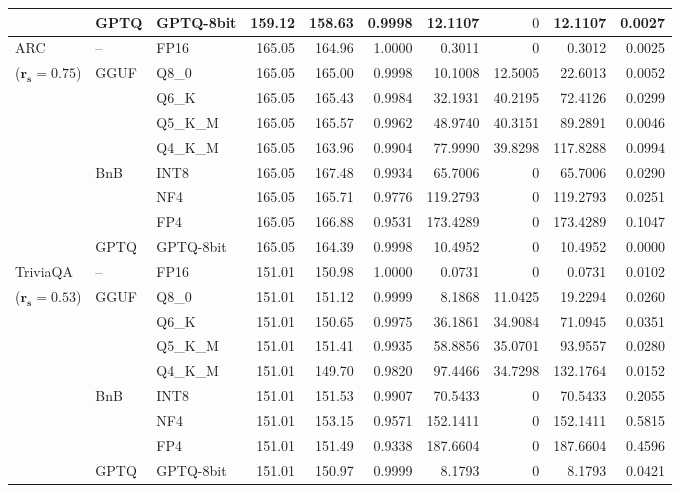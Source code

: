 \begin{longtable}{ll l rrrrrrr}
 & GPTQ & GPTQ-8bit & 159.12 & 158.63 & 0.9998 & 12.1107 & \cellcolor{cyan!12} $0$ & 12.1107 & 0.0027 \\
\midrule
ARC & -- & FP16 & 165.05 & 164.96 & 1.0000 & 0.3011 & \cellcolor{cyan!12} $0$ & 0.3012 & 0.0025 \\
{\small ($\mathbf{r_s{=}0.75}$)} & GGUF & Q8\_0 & 165.05 & 165.00 & 0.9998 & 10.1008 & 12.5005 & 22.6013 & 0.0052 \\
 &  & Q6\_K & 165.05 & 165.43 & 0.9984 & 32.1931 & 40.2195 & 72.4126 & 0.0299 \\
 &  & Q5\_K\_M & 165.05 & 165.57 & 0.9962 & 48.9740 & 40.3151 & 89.2891 & 0.0046 \\
 &  & Q4\_K\_M & 165.05 & 163.96 & 0.9904 & 77.9990 & 39.8298 & 117.8288 & 0.0994 \\
 & BnB & INT8 & 165.05 & 167.48 & 0.9934 & 65.7006 & \cellcolor{cyan!12} $0$ & 65.7006 & 0.0290 \\
 &  & NF4 & 165.05 & 165.71 & 0.9776 & 119.2793 & \cellcolor{cyan!12} $0$ & 119.2793 & 0.0251 \\
 &  & FP4 & 165.05 & 166.88 & 0.9531 & 173.4289 & \cellcolor{cyan!12} $0$ & 173.4289 & 0.1047 \\
 & GPTQ & GPTQ-8bit & 165.05 & 164.39 & 0.9998 & 10.4952 & \cellcolor{cyan!12} $0$ & 10.4952 & 0.0000 \\
\midrule
TriviaQA & -- & FP16 & 151.01 & 150.98 & 1.0000 & 0.0731 & \cellcolor{cyan!12} $0$ & 0.0731 & 0.0102 \\
{\small ($\mathbf{r_s{=}0.53}$)} & GGUF & Q8\_0 & 151.01 & 151.12 & 0.9999 & 8.1868 & 11.0425 & 19.2294 & 0.0260 \\
 &  & Q6\_K & 151.01 & 150.65 & 0.9975 & 36.1861 & 34.9084 & 71.0945 & 0.0351 \\
 &  & Q5\_K\_M & 151.01 & 151.41 & 0.9935 & 58.8856 & 35.0701 & 93.9557 & 0.0280 \\
 &  & Q4\_K\_M & 151.01 & 149.70 & 0.9820 & 97.4466 & 34.7298 & 132.1764 & 0.0152 \\
 & BnB & INT8 & 151.01 & 151.53 & 0.9907 & 70.5433 & \cellcolor{cyan!12} $0$ & 70.5433 & 0.2055 \\
 &  & NF4 & 151.01 & 153.15 & 0.9571 & 152.1411 & \cellcolor{cyan!12} $0$ & 152.1411 & 0.5815 \\
 &  & FP4 & 151.01 & 151.49 & \cellcolor{red!18} 0.9338 & \cellcolor{red!18} 187.6604 & \cellcolor{cyan!12} $0$ & \cellcolor{red!18} 187.6604 & \cellcolor{red!18} 0.4596 \\
 & GPTQ & GPTQ-8bit & 151.01 & 150.97 & 0.9999 & 8.1793 & \cellcolor{cyan!12} $0$ & 8.1793 & 0.0421 \\

\end{longtable}
